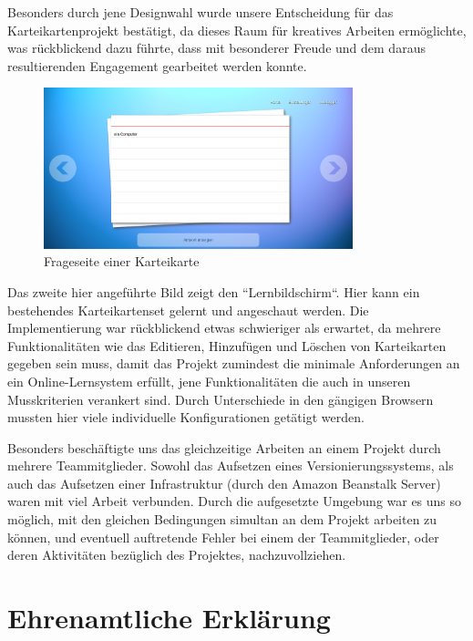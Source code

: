 \documentclass{article}
\begin{document}
Besonders durch jene Designwahl wurde unsere Entscheidung für das Karteikartenprojekt bestätigt, da dieses Raum für kreatives Arbeiten ermöglichte, was rückblickend dazu führte, dass mit besonderer Freude und dem daraus resultierenden Engagement gearbeitet werden konnte.

\begin{figure}[H]
    \centering
    \includegraphics[width=0.8\textwidth]{images/learningscreen-answer.png}
    \caption{Frageseite einer Karteikarte}
    \label{fig:learning-question}
\end{figure}

Das zweite hier angeführte Bild zeigt den ``Lernbildschirm``. Hier kann ein bestehendes Karteikartenset gelernt und angeschaut werden. Die Implementierung war rückblickend etwas schwieriger als erwartet, da mehrere Funktionalitäten wie das Editieren, Hinzufügen und Löschen von Karteikarten gegeben sein muss, damit das Projekt zumindest die minimale Anforderungen an ein Online-Lernsystem erfüllt, jene Funktionalitäten die auch in unseren Musskriterien verankert sind. Durch Unterschiede in den gängigen Browsern mussten hier viele individuelle Konfigurationen getätigt werden.

Besonders beschäftigte uns das gleichzeitige Arbeiten an einem Projekt durch mehrere Teammitglieder. Sowohl das Aufsetzen eines Versionierungssystems, als auch das Aufsetzen einer Infrastruktur (durch den Amazon Beanstalk Server) waren mit viel Arbeit verbunden. Durch die aufgesetzte Umgebung war es uns so möglich, mit den gleichen Bedingungen simultan an dem Projekt arbeiten zu können, und eventuell auftretende Fehler bei einem der Teammitglieder, oder deren Aktivitäten bezüglich des Projektes, nachzuvollziehen.

\newpage
\section{Ehrenamtliche Erklärung}
\end{document}
